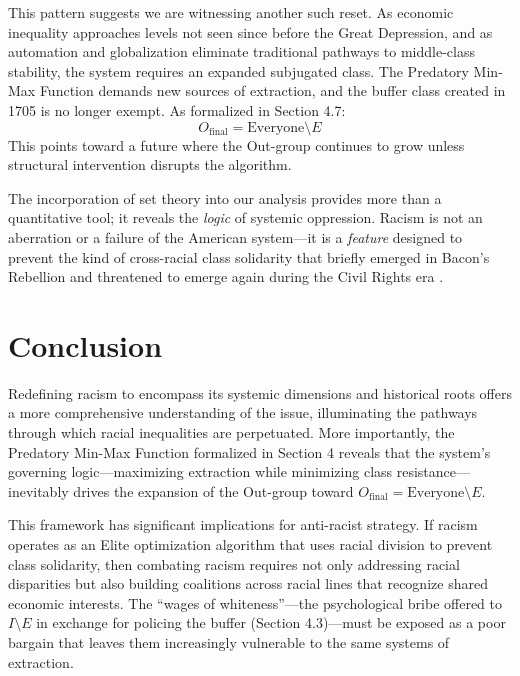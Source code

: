 \documentclass[12pt]{article}
\begin{document}
This pattern suggests we are witnessing another such reset. As economic inequality approaches levels not seen since before the Great Depression, and as automation and globalization eliminate traditional pathways to middle-class stability, the system requires an expanded subjugated class. The Predatory Min-Max Function demands new sources of extraction, and the buffer class created in 1705 is no longer exempt. As formalized in Section 4.7:
\[
O_{\text{final}} = \text{Everyone} \setminus E
\]
This points toward a future where the Out-group continues to grow unless structural intervention disrupts the algorithm.

The incorporation of set theory into our analysis provides more than a quantitative tool; it reveals the \textit{logic} of systemic oppression. Racism is not an aberration or a failure of the American system---it is a \textit{feature} designed to prevent the kind of cross-racial class solidarity that briefly emerged in Bacon's Rebellion and threatened to emerge again during the Civil Rights era \cite{robinson, allen, bonillasilva}.

\section{Conclusion}

Redefining racism to encompass its systemic dimensions and historical roots offers a more comprehensive understanding of the issue, illuminating the pathways through which racial inequalities are perpetuated. More importantly, the Predatory Min-Max Function formalized in Section 4 reveals that the system's governing logic---maximizing extraction while minimizing class resistance---inevitably drives the expansion of the Out-group toward $O_{\text{final}} = \text{Everyone} \setminus E$.

This framework has significant implications for anti-racist strategy. If racism operates as an Elite optimization algorithm that uses racial division to prevent class solidarity, then combating racism requires not only addressing racial disparities but also building coalitions across racial lines that recognize shared economic interests. The ``wages of whiteness''---the psychological bribe offered to $I \setminus E$ in exchange for policing the buffer (Section 4.3)---must be exposed as a poor bargain that leaves them increasingly vulnerable to the same systems of extraction.
\end{document}
